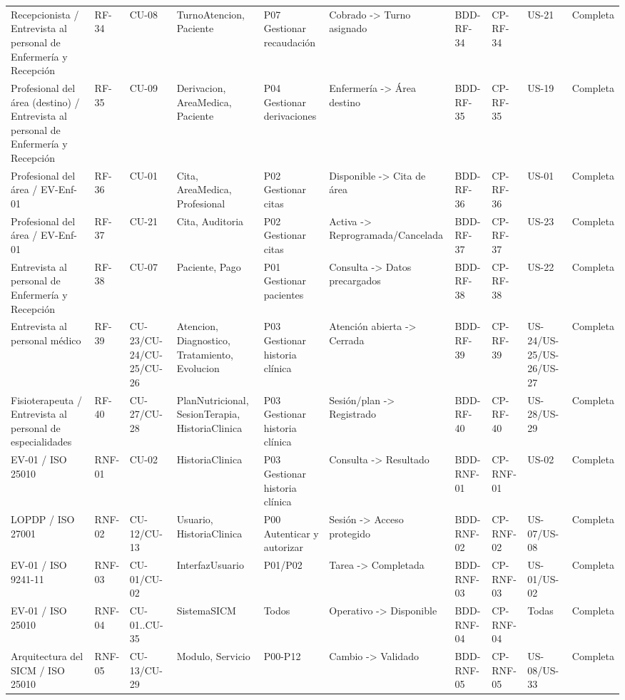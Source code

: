 \documentclass[11pt,a4paper]{article}
\begin{document}
\begin{appendices}
\begin{landscape}
\begin{longtable}{p{2.2cm}p{1.8cm}p{2cm}p{3cm}p{3cm}p{3cm}p{2cm}p{2cm}p{2cm}p{1.6cm}}
				Recepcionista / Entrevista al personal de Enfermería y Recepción & RF-34 & CU-08 & TurnoAtencion, Paciente & P07 Gestionar recaudación & Cobrado -> Turno asignado & BDD-RF-34 & CP-RF-34 & US-21 & Completa\\
				Profesional del área (destino) / Entrevista al personal de Enfermería y Recepción & RF-35 & CU-09 & Derivacion, AreaMedica, Paciente & P04 Gestionar derivaciones & Enfermería -> Área destino & BDD-RF-35 & CP-RF-35 & US-19 & Completa\\
				Profesional del área / EV-Enf-01 & RF-36 & CU-01 & Cita, AreaMedica, Profesional & P02 Gestionar citas & Disponible -> Cita de área & BDD-RF-36 & CP-RF-36 & US-01 & Completa\\
				Profesional del área / EV-Enf-01 & RF-37 & CU-21 & Cita, Auditoria & P02 Gestionar citas & Activa -> Reprogramada/Cancelada & BDD-RF-37 & CP-RF-37 & US-23 & Completa\\
				Entrevista al personal de Enfermería y Recepción & RF-38 & CU-07 & Paciente, Pago & P01 Gestionar pacientes & Consulta -> Datos precargados & BDD-RF-38 & CP-RF-38 & US-22 & Completa\\
				Entrevista al personal médico & RF-39 & CU-23/CU-24/CU-25/CU-26 & Atencion, Diagnostico, Tratamiento, Evolucion & P03 Gestionar historia clínica & Atención abierta -> Cerrada & BDD-RF-39 & CP-RF-39 & US-24/US-25/US-26/US-27 & Completa\\
				Fisioterapeuta / Entrevista al personal de especialidades & RF-40 & CU-27/CU-28 & PlanNutricional, SesionTerapia, HistoriaClinica & P03 Gestionar historia clínica & Sesión/plan -> Registrado & BDD-RF-40 & CP-RF-40 & US-28/US-29 & Completa\\
				EV-01 / ISO 25010 & RNF-01 & CU-02 & HistoriaClinica & P03 Gestionar historia clínica & Consulta -> Resultado & BDD-RNF-01 & CP-RNF-01 & US-02 & Completa\\
				LOPDP / ISO 27001 & RNF-02 & CU-12/CU-13 & Usuario, HistoriaClinica & P00 Autenticar y autorizar & Sesión -> Acceso protegido & BDD-RNF-02 & CP-RNF-02 & US-07/US-08 & Completa\\
				EV-01 / ISO 9241-11 & RNF-03 & CU-01/CU-02 & InterfazUsuario & P01/P02 & Tarea -> Completada & BDD-RNF-03 & CP-RNF-03 & US-01/US-02 & Completa\\
				EV-01 / ISO 25010 & RNF-04 & CU-01..CU-35 & SistemaSICM & Todos & Operativo -> Disponible & BDD-RNF-04 & CP-RNF-04 & Todas & Completa\\
				Arquitectura del SICM / ISO 25010 & RNF-05 & CU-13/CU-29 & Modulo, Servicio & P00-P12 & Cambio -> Validado & BDD-RNF-05 & CP-RNF-05 & US-08/US-33 & Completa\\

\end{longtable}
\end{landscape}
\end{appendices}
\end{document}
